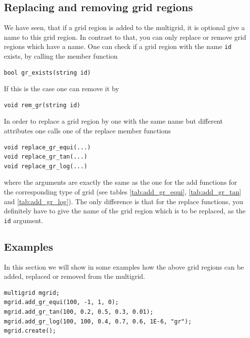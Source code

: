 \subsection{Replacing and removing grid regions}\label{subsec:grid_region_replace_remove}
We have seen, that if a grid region is added to the multigrid, it is optional give a name to this grid region. In contrast to that, you can only replace or remove grid regions which have a name. One can check if a grid region with the name \texttt{id} exists, by calling the member function
\begin{lstlisting}
bool gr_exists(string id)
\end{lstlisting}
If this is the case one can remove it by
\begin{lstlisting}
void rem_gr(string id)
\end{lstlisting}
In order to replace a grid region by one with the same name but different attributes one calls one of the replace member functions
\begin{lstlisting}
void replace_gr_equi(...)
void replace_gr_tan(...)
void replace_gr_log(...)
\end{lstlisting}
where the arguments are exactly the same as the one for the add functions for the corresponding type of grid (see tables \ref{tab:add_gr_equi}, \ref{tab:add_gr_tan} and \ref{tab:add_gr_log}). The only difference is that for the replace functions, you definitely have to give the name of the grid region which is to be replaced, as the \texttt{id} argument.

\subsection{Examples}\label{subsec:grid_region_examples}

In this section we will show in some examples how the above grid regions can be added, replaced or removed from the multigrid. 

\begin{lstlisting}[caption={Example for adding grid regions},label={lst:add_gr}]
multigrid mgrid;
mgrid.add_gr_equi(100, -1, 1, 0);
mgrid.add_gr_tan(100, 0.2, 0.5, 0.3, 0.01);
mgrid.add_gr_log(100, 100, 0.4, 0.7, 0.6, 1E-6, "gr");
mgrid.create();
\end{lstlisting}

